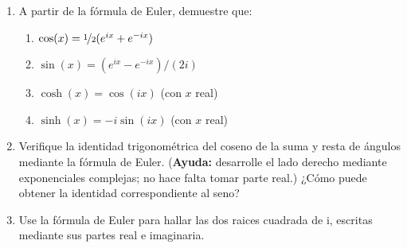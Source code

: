 \documentclass[11pt,spanish]{article}
\begin{document}
\begin{enumerate}

    \item A partir de la fórmula de Euler, demuestre que:
    
    \begin{enumerate}
        \item $\cos(x) = \nicefrac{1}{2}(e^{ix} + e^{-ix})$
        \item $\sin(x) = (e^{ix} - e^{-ix}) / (2i)$
        \item $\cosh(x) = \cos(ix)$ (con $x$ real)
        \item $\sinh(x) = -i \sin(ix)$ (con $x$ real)
    \end{enumerate}
    

    \item Verifique la identidad trigonométrica del coseno de la suma y resta de ángulos mediante la fórmula de Euler. (\textbf{Ayuda:} desarrolle el lado derecho mediante exponenciales complejas; no hace falta tomar parte real.) ¿Cómo puede obtener la identidad correspondiente al seno?


    \item Use la fórmula de Euler para hallar las dos raices cuadrada de i, escritas mediante sus partes real e imaginaria.

\end{enumerate}
\end{document}
